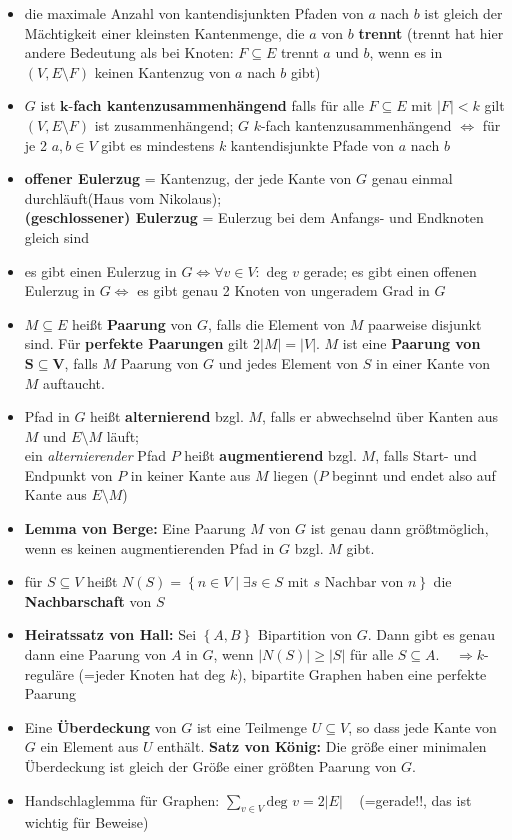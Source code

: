 \documentclass[10pt,a4paper]{article}
\begin{document}
\begin{itemize}
\item die maximale Anzahl von kantendisjunkten Pfaden von $a$ nach $b$ ist gleich der Mächtigkeit einer kleinsten Kantenmenge, die $a$ von $b$ \textbf{trennt} (trennt hat hier andere Bedeutung als bei Knoten: $F\subseteq E$ trennt $a$ und $b$, wenn es in $(V, E\setminus F)$ keinen Kantenzug von $a$ nach $b$ gibt)
\item $G$ ist $\boldsymbol{k}$-\textbf{fach kantenzusammenhängend} falls für alle $F \subseteq E$ mit $\vert F \vert <k$ gilt $(V,E\setminus F)$ ist zusammenhängend;
$G$ $k$-fach kantenzusammenhängend $\Leftrightarrow$ für je 2 $a,b\in V$ gibt es mindestens $k$ kantendisjunkte Pfade von $a$ nach $b$
\item \textbf{offener Eulerzug} = Kantenzug, der jede Kante von $G$ genau einmal durchläuft(Haus vom Nikolaus);\\ \textbf{(geschlossener) Eulerzug} = Eulerzug bei dem Anfangs- und Endknoten gleich sind 
\item es gibt einen Eulerzug in $G\Leftrightarrow \forall v\in V :$ deg $v$ gerade; es gibt einen offenen Eulerzug in $G\Leftrightarrow$ es gibt genau 2 Knoten von ungeradem Grad in $G$
\item $M\subseteq E$ heißt \textbf{Paarung} von $G$, falls die Element von $M$ paarweise disjunkt sind. Für \textbf{perfekte Paarungen} gilt $2\vert M\vert=\vert V\vert$. $M$ ist eine \textbf{Paarung von} $\boldsymbol{S\subseteq V}$, falls $M$ Paarung von $G$ und jedes Element von $S$ in einer Kante von $M$ auftaucht.
\item Pfad in $G$ heißt \textbf{alternierend} bzgl. $M$, falls er abwechselnd über Kanten aus $M$ und $E\setminus M$ läuft;\\ ein \textit{alternierender} Pfad $P$ heißt \textbf{augmentierend} bzgl. $M$, falls Start- und Endpunkt von $P$ in keiner Kante aus $M$ liegen ($P$ beginnt und endet also auf Kante aus $E\setminus M$)
\item \textbf{Lemma von Berge:} Eine Paarung $M$ von $G$ ist genau dann größtmöglich, wenn es keinen augmentierenden Pfad in $G$ bzgl. $M$ gibt.
\item für $S\subseteq V$ heißt $N(S)=\left\lbrace n\in V\mid \exists s\in S  \text{ mit } s \text{ Nachbar von }n\right\rbrace$ die \textbf{Nachbarschaft} von $S$
\item \textbf{Heiratssatz von Hall:} Sei $\left\lbrace A,B \right\rbrace$ Bipartition von $G$. Dann gibt es genau dann eine Paarung von $A$ in $G$, wenn $\vert N(S)\vert\geq \vert S\vert$ für alle $S\subseteq A$.$\;\;\;\; \Rightarrow k$-reguläre (=jeder Knoten hat deg $k$), bipartite Graphen haben eine perfekte Paarung 
\item Eine \textbf{Überdeckung} von $G$ ist eine Teilmenge $U\subseteq V$, so dass jede Kante von $G$ ein Element aus $U$ enthält. \textbf{Satz von König:} Die größe einer minimalen Überdeckung ist gleich der Größe einer größten Paarung von $G$.
\item Handschlaglemma für Graphen: $\sum_{v\in V} \text{deg }v=2\vert E \vert\;\;\;$ (=gerade!!, das ist wichtig für Beweise)
\end{itemize}
\end{document}
